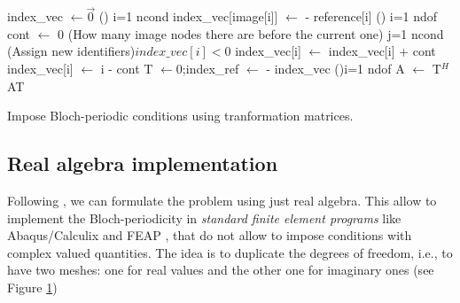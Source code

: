\begin{algorithm}[h]  
\DontPrintSemicolon
{}
\BlankLine
index\_vec $\leftarrow \vec{0}$   
\For(){ i=1 \KwTo ncond}{
	index\_vec[image[i]] $\leftarrow$ - reference[i] 
}
\For(){ i=1 \KwTo ndof}{
	cont $\leftarrow$ 0\;
	\For(How many image nodes there are before the current one){ j=1 \KwTo ncond}{
	}
	\eIf(Assign new identifiers){$index\_vec[i]<0$}{
		index\_vec[i] $\leftarrow$ index\_vec[i] + cont\;		
	}{
		index\_vec[i] $\leftarrow$ i - cont\;	
	}
}
T $\leftarrow 0$;\qquad index\_ref $\leftarrow$ - index\_vec\;
\For(){i=1 \KwTo ndof}{
}
A $\leftarrow$ T$^H$AT
\caption{Impose Bloch-periodic conditions using tranformation matrices.}\label{algo:bloch_matrix}
\end{algorithm}


\subsection{Real algebra implementation}
Following \cite{aberg1997}, we can formulate the problem using just real algebra. This allow to implement the Bloch-periodicity in \emph{standard finite element programs} like Abaqus/Calculix and FEAP \cite{feap_manual,Abaqus_manual,Calculix_manual}, that do not allow to impose conditions with complex valued quantities. The idea is to duplicate the degrees of freedom, i.e., to have two meshes: one for real values and the other one for imaginary ones (see Figure \ref{fig:double_mesh_real})
\begin{figure}
\label{fig:double_mesh_real}
\end{figure}

